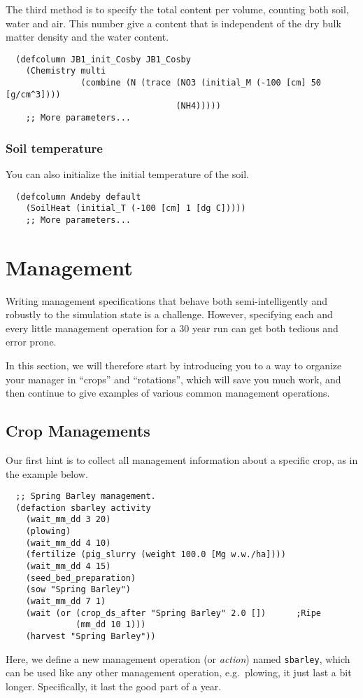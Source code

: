 \documentclass[a4paper]{article}
\begin{document}
The third method is to specify the total content per volume, counting
both soil, water and air. This number give a content that is
independent of the dry bulk matter density and the water content. 
\begin{verbatim}
  (defcolumn JB1_init_Cosby JB1_Cosby
    (Chemistry multi
               (combine (N (trace (NO3 (initial_M (-100 [cm] 50 [g/cm^3])))
                                  (NH4)))))
    ;; More parameters...
\end{verbatim}

\subsubsection{Soil temperature}

You can also initialize the initial temperature of the soil.
\begin{verbatim}
  (defcolumn Andeby default 
    (SoilHeat (initial_T (-100 [cm] 1 [dg C]))))
    ;; More parameters...
\end{verbatim}

\section{Management}
\label{sec:management}

Writing management specifications that behave both semi-intelligently
and robustly to the simulation state is a challenge.  However,
specifying each and every little management operation for a 30 year
run can get both tedious and error prone.

In this section, we will therefore start by introducing you to a way
to organize your manager in ``crops'' and ``rotations'', which will
save you much work, and then continue to give examples of various
common management operations.

\subsection{Crop Managements}
\label{sec:crop-man}

Our first hint is to collect all management information about a
specific crop, as in the example below.
\begin{verbatim}
  ;; Spring Barley management.
  (defaction sbarley activity
    (wait_mm_dd 3 20)
    (plowing)
    (wait_mm_dd 4 10)
    (fertilize (pig_slurry (weight 100.0 [Mg w.w./ha])))
    (wait_mm_dd 4 15)
    (seed_bed_preparation)
    (sow "Spring Barley")
    (wait_mm_dd 7 1)
    (wait (or (crop_ds_after "Spring Barley" 2.0 [])      ;Ripe
              (mm_dd 10 1)))
    (harvest "Spring Barley"))
\end{verbatim}
Here, we define a new management operation (or \emph{action}) named
\texttt{sbarley}, which can be used like any other management
operation, e.g.\ plowing, it just last a bit longer.  Specifically, it
last the good part of a year.
\end{document}
